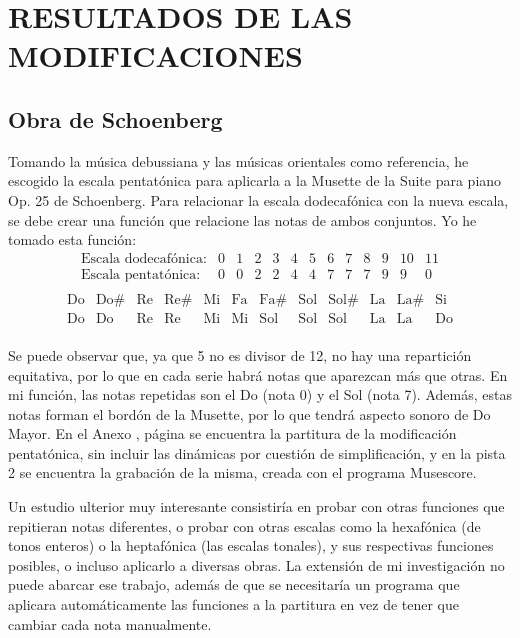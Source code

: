 	\chapter{RESULTADOS DE LAS MODIFICACIONES}
    
    
    \section{Obra de Schoenberg}
   
   	Tomando la música debussiana y las músicas orientales como referencia, he escogido la escala pentatónica para aplicarla a la Musette de la Suite para piano Op. 25 de Schoenberg. Para relacionar la escala dodecafónica con la nueva escala, se debe crear una función que relacione las notas de ambos conjuntos. Yo he tomado esta función:
   	$$\left.\begin{matrix}\text{Escala dodecafónica:}&0&1&2&3&4&5&6&7&8&9&10&11\\\text{Escala pentatónica:}&0&0&2&2&4&4&7&7&7&9&9&0\\\end{matrix}\right.$$
   	$$\left.\begin{matrix}\text{Do}&\text{Do\#}&\text{Re}&\text{Re\#}&\text{Mi}&\text{Fa}&\text{Fa\#}&\text{Sol}&\text{Sol\#}&\text{La}&\text{La\#}&\text{Si}\\\text{Do}&\text{Do}&\text{Re}&\text{Re}&\text{Mi}&\text{Mi}&\text{Sol}&\text{Sol}&\text{Sol}&\text{La}&\text{La}&\text{Do}\\\end{matrix}\right.$$
   	
   	Se puede observar que, ya que 5 no es divisor de 12, no hay una repartición equitativa, por lo que en cada serie habrá notas que aparezcan más que otras. En mi función, las notas repetidas son el Do (nota 0) y el Sol (nota 7). Además, estas notas forman el bordón de la Musette, por lo que tendrá aspecto sonoro de Do Mayor. En el Anexo , página  se encuentra la partitura de la modificación pentatónica, sin incluir las dinámicas por cuestión de simplificación, y en la pista 2 se encuentra la grabación de la misma, creada con el programa Musescore.
   	
   	Un estudio ulterior muy interesante consistiría en probar con otras funciones que repitieran notas diferentes, o probar con otras escalas como la hexafónica (de tonos enteros) o la heptafónica (las escalas tonales), y sus respectivas funciones posibles, o incluso aplicarlo a diversas obras. La extensión de mi investigación no puede abarcar ese trabajo, además de que se necesitaría un programa que aplicara automáticamente las funciones a la partitura en vez de tener que cambiar cada nota manualmente.
   	
